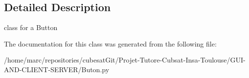 \subsection{Detailed Description}
\begin{DoxyVerb}class for a Button\end{DoxyVerb}
 

The documentation for this class was generated from the following file\+:\begin{DoxyCompactItemize}
\item 
/home/marc/repositories/cubesat\+Git/\+Projet-\/\+Tutore-\/\+Cubsat-\/\+Insa-\/\+Toulouse/\+G\+U\+I-\/\+A\+N\+D-\/\+C\+L\+I\+E\+N\+T-\/\+S\+E\+R\+V\+E\+R/Buton.\+py\end{DoxyCompactItemize}

